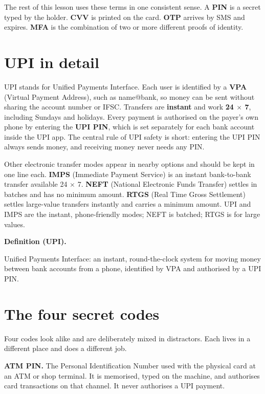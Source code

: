 \documentclass[11pt]{article}
\newenvironment{definitionbox}[1]{%
  \par\noindent\textbf{Definition (#1).}\ \itshape
}{\par\vspace{0.3em}}
\begin{document}
The rest of this lesson uses these terms in one consistent sense. A
\textbf{PIN} is a secret typed by the holder. \textbf{CVV} is printed on the
card. \textbf{OTP} arrives by SMS and expires. \textbf{MFA} is the
combination of two or more different proofs of identity.

\section{UPI in detail}
UPI stands for Unified Payments Interface. Each user is identified by a
\textbf{VPA} (Virtual Payment Address), such as name@bank, so money can be
sent without sharing the account number or IFSC. Transfers are
\textbf{instant} and work \textbf{24 $\times$ 7}, including Sundays and
holidays. Every payment is authorised on the payer's own phone by entering
the \textbf{UPI PIN}, which is set separately for each bank account inside
the UPI app. The central rule of UPI safety is short: entering the UPI PIN
always sends money, and receiving money never needs any PIN.

Other electronic transfer modes appear in nearby options and should be kept
in one line each. \textbf{IMPS} (Immediate Payment Service) is an instant
bank-to-bank transfer available 24 $\times$ 7. \textbf{NEFT} (National
Electronic Funds Transfer) settles in batches and has no minimum amount.
\textbf{RTGS} (Real Time Gross Settlement) settles large-value transfers
instantly and carries a minimum amount. UPI and IMPS are the instant,
phone-friendly modes; NEFT is batched; RTGS is for large values.

\begin{definitionbox}{UPI}
Unified Payments Interface: an instant, round-the-clock system for moving
money between bank accounts from a phone, identified by VPA and authorised by
a UPI PIN.
\end{definitionbox}

\section{The four secret codes}
Four codes look alike and are deliberately mixed in distractors. Each lives
in a different place and does a different job.

\textbf{ATM PIN.} The Personal Identification Number used with the physical
card at an ATM or shop terminal. It is memorised, typed on the machine, and
authorises card transactions on that channel. It never authorises a UPI
payment.
\end{document}
